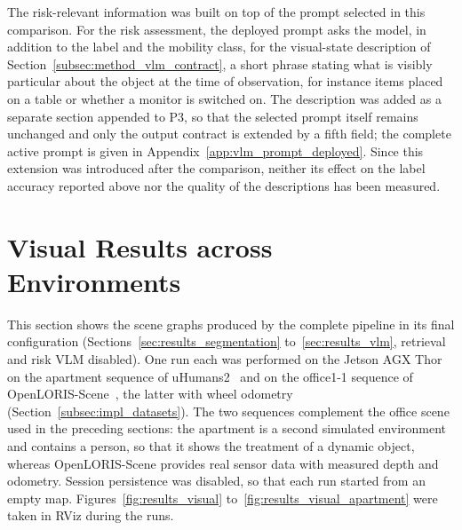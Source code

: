 {\small The risk-relevant information was built on top of the prompt selected in this comparison. For the risk assessment, the deployed prompt asks the model, in addition to the label and the mobility class, for the visual-state description of Section~\ref{subsec:method_vlm_contract}, a short phrase stating what is visibly particular about the object at the time of observation, for instance items placed on a table or whether a monitor is switched on. The description was added as a separate section appended to P3, so that the selected prompt itself remains unchanged and only the output contract is extended by a fifth field; the complete active prompt is given in Appendix~\ref{app:vlm_prompt_deployed}. Since this extension was introduced after the comparison, neither its effect on the label accuracy reported above nor the quality of the descriptions has been measured.\par}














\section{Visual Results across Environments}
\label{sec:results_visual}

{\small This section shows the scene graphs produced by the complete pipeline in its final configuration (Sections~\ref{sec:results_segmentation} to~\ref{sec:results_vlm}, retrieval and risk VLM disabled). One run each was performed on the Jetson AGX Thor on the apartment sequence of uHumans2~\cite{rosinol2021kimera} and on the office1-1 sequence of OpenLORIS-Scene~\cite{shi2020openloris}, the latter with wheel odometry (Section~\ref{subsec:impl_datasets}). The two sequences complement the office scene used in the preceding sections: the apartment is a second simulated environment and contains a person, so that it shows the treatment of a dynamic object, whereas OpenLORIS-Scene provides real sensor data with measured depth and odometry. Session persistence was disabled, so that each run started from an empty map. Figures~\ref{fig:results_visual} to~\ref{fig:results_visual_apartment} were taken in RViz during the runs.\par}

